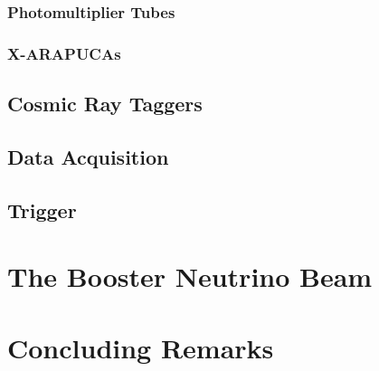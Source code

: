 \subsubsection{Photomultiplier Tubes}

\subsubsection{X-ARAPUCAs}

\subsection{Cosmic Ray Taggers}

\subsection{Data Acquisition}

\subsection{Trigger}


\section{The Booster Neutrino Beam}

\section{Concluding Remarks}
